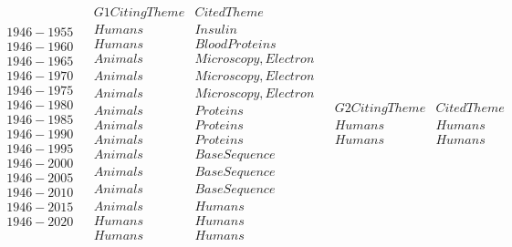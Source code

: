 \begin{table}[h]
\begin{center}
\caption{Most Frequent Themes by Paper Group for Each Cumulative Generation}
\label{tab:topmesh}
{\tiny
\[
\begin{array}{c|cccc}
\begin{array}{c}
{ } \\
\hline
{1946-1955} \\
{1946-1960} \\
{1946-1965} \\
{1946-1970} \\
{1946-1975} \\
{1946-1980} \\
{1946-1985} \\
{1946-1990} \\
{1946-1995} \\
{1946-2000} \\
{1946-2005} \\
{1946-2010} \\
{1946-2015} \\
{1946-2020} \\
\end{array}
&
\begin{array}{cc}
{G1 Citing Theme} & {Cited Theme} \\
\hline
{Humans} & {Insulin} \\
{Humans} & {Blood Proteins} \\
{Animals} & {Microscopy, Electron} \\
{Animals} & {Microscopy, Electron} \\
{Animals} & {Microscopy, Electron} \\
{Animals} & {Proteins} \\
{Animals} & {Proteins} \\
{Animals} & {Proteins} \\
{Animals} & {Base Sequence} \\
{Animals} & {Base Sequence} \\
{Animals} & {Base Sequence} \\
{Animals} & {Humans} \\
{Humans} & {Humans} \\
{Humans} & {Humans} \\
\end{array}
&
\begin{array}{cc}
{G2 Citing Theme} & {Cited Theme} \\
\hline
{Humans} & {Humans} \\
{Humans} & {Humans} \\

\end{array}
\end{array}\]}
\end{center}
\end{table}
